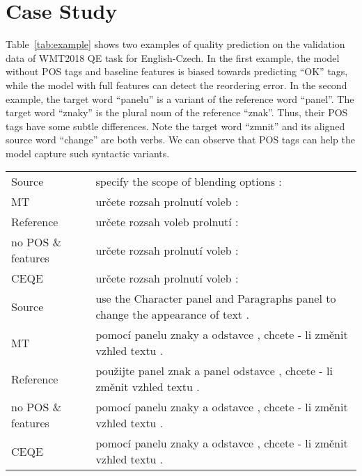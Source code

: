 \documentclass[11pt,a4paper]{article}
\begin{document}
\section{Case Study}
Table~\ref{tab:example} shows two examples of quality prediction on the validation data of WMT2018 QE task for English-Czech. In the first example, the model without POS tags and baseline features is biased towards predicting ``OK'' tags, while the model with full features can detect the reordering error. In the second example, the target word ``panelu'' is a variant of the reference word ``panel''.  The target word ``znaky'' is the plural noun of the reference ``znak''. Thus, their POS tags have some subtle differences. Note the target word ``zmnit'' and its aligned source word ``change'' are both verbs. We can observe that POS tags can help the model capture such syntactic variants.   

\begin{table*}[tbh]
\setlength\tabcolsep{3pt} 
\centering
\begin{tabular}{ll}
\hline
Source & specify the scope of blending options : \\
MT & ur\v{c}ete rozsah {\color{blue}prolnut\'{i} voleb} :  \\
Reference & ur\v{c}ete rozsah {\color{blue}voleb prolnut\'{i}} :  \\
no POS \& features & {\color{green}ur\v{c}ete rozsah prolnut\'{i} voleb :}  \\
CEQE & {\color{green}ur\v{c}ete rozsah {\color{red}prolnut\'{i} voleb} :}  \\ \hline 

Source & use the Character panel and Paragraphs panel to change the appearance of text . \\
MT & {\color{blue}pomoc\'{i} panelu znaky} a odstavce , chcete - li zm\v{e}nit vzhled textu .\\
Reference & {\color{blue}pou\v{z}ijte panel znak} a panel odstavce , chcete - li zm\v{e}nit vzhled textu .\\
no POS \& features & {\color{red}pomoc\'{i}} {\color{green}panelu znaky a odstavce} {\color{red}, chcete - li změnit} {\color{green}vzhled textu .}\\
CEQE & {\color{red}pomoc\'{i} panelu znaky} {\color{green}a odstavce {\color{red}, chcete} - li zm\v{e}nit vzhled textu .}\\
\hline 
\end{tabular}
\caption{Examples on WMT2018 validation data. The source and translated sentences, the reference sentences, the predictions of the CEQE without and with POS tags and baseline features are shown. Words predicted as OK are shown in {\color{green}green}, those predicted as BAD are shown in {\color{red}red}, the difference between the translated and reference sentences are shown in {\color{blue}blue}.\label{tab:example}} 
\end{table*}
\end{document}
